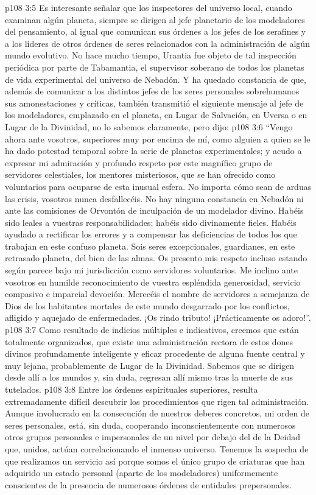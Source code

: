 \vs p108 3:5 \pc Es interesante señalar que los inspectores del universo local, cuando examinan algún planeta, siempre se dirigen al jefe planetario de los modeladores del pensamiento, al igual que comunican sus órdenes a los jefes de los serafines y a los líderes de otros órdenes de seres relacionados con la administración de algún mundo evolutivo. No hace mucho tiempo, Urantia fue objeto de tal inspección periódica por parte de Tabamantia, el supervisor soberano de todos los planetas de vida experimental del universo de Nebadón. Y ha quedado constancia de que, además de comunicar a los distintos jefes de los seres personales sobrehumanos sus amonestaciones y críticas, también transmitió el siguiente mensaje al jefe de los modeladores, emplazado en el planeta, en Lugar de Salvación, en Uversa o en Lugar de la Divinidad, no lo sabemos claramente, pero dijo:
\vs p108 3:6 “Vengo ahora ante vosotros, superiores muy por encima de mí, como alguien a quien se le ha dado potestad temporal sobre la serie de planetas experimentales; y acudo a expresar mi admiración y profundo respeto por este magnífico grupo de servidores celestiales, los mentores misteriosos, que se han ofrecido como voluntarios para ocuparse de esta inusual esfera. No importa cómo sean de arduas las crisis, vosotros nunca desfallecéis. No hay ninguna constancia en Nebadón ni ante las comisiones de Orvontón de inculpación de un modelador divino. Habéis sido leales a vuestras responsabilidades; habéis sido divinamente fieles. Habéis ayudado a rectificar los errores y a compensar las deficiencias de todos los que trabajan en este confuso planeta. Sois seres excepcionales, guardianes, en este retrasado planeta, del bien de las almas. Os presento mis respeto incluso estando según parece bajo mi jurisdicción como servidores voluntarios. Me inclino ante vosotros en humilde reconocimiento de vuestra espléndida generosidad, servicio compasivo e imparcial devoción. Merecéis el nombre de servidores a semejanza de Dios de los habitantes mortales de este mundo desgarrado por los conflictos, afligido y aquejado de enfermedades. ¡Os rindo tributo! ¡Prácticamente os adoro!”.
\vs p108 3:7 \pc Como resultado de indicios múltiples e indicativos, creemos que están totalmente organizados, que existe una administración rectora de estos dones divinos profundamente inteligente y eficaz procedente de alguna fuente central y muy lejana, probablemente de Lugar de la Divinidad. Sabemos que se dirigen desde allí a los mundos y, sin duda, regresan allí mismo tras la muerte de sus tutelados.
\vs p108 3:8 Entre los órdenes espirituales superiores, resulta extremadamente difícil descubrir los procedimientos que rigen tal administración. Aunque involucrado en la consecución de nuestros deberes concretos, mi orden de seres personales, está, sin duda, cooperando inconscientemente con numerosos otros grupos personales e impersonales de un nivel por debajo del de la Deidad que, unidos, actúan correlacionando el inmenso universo. Tenemos la sospecha de que realizamos un servicio así porque somos el único grupo de criaturas que han adquirido un estado personal (aparte de los modeladores) uniformemente conscientes de la presencia de numerosos órdenes de entidades prepersonales.
